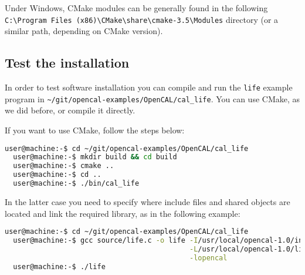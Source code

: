 Under Windows, CMake modules can be generally found in the following  
\verb'C:\Program Files (x86)\CMake\share\cmake-3.5\Modules' directory (or a
similar path, depending on CMake version).


\subsection{Test the installation}\label{sec:installation:test_installation}

In order to test software installation you can compile and run the
\verb'life' example program in
\verb'~/git/opencal-examples/OpenCAL/cal_life'. You can use CMake, as
we did before, or compile it directly.

If you want to use CMake, follow the steps below:

\begin{lstlisting}[numbers=none,language=bash]
  user@machine:-$ cd ~/git/opencal-examples/OpenCAL/cal_life
  user@machine:-$ mkdir build && cd build
  user@machine:-$ cmake ..
  user@machine:-$ cd ..
  user@machine:-$ ./bin/cal_life  
\end{lstlisting}


In the latter case you need to specify where include files and shared objects are located
and link the required library, as in the following example:
\begin{lstlisting}[numbers=none,language=bash,label={ch:quickstart:gcc-full}]
  user@machine:-$ cd ~/git/opencal-examples/OpenCAL/cal_life
  user@machine:-$ gcc source/life.c -o life -I/usr/local/opencal-1.0/include \
                                            -L/usr/local/opencal-1.0/lib \
                                            -lopencal
  user@machine:-$ ./life
\end{lstlisting}

